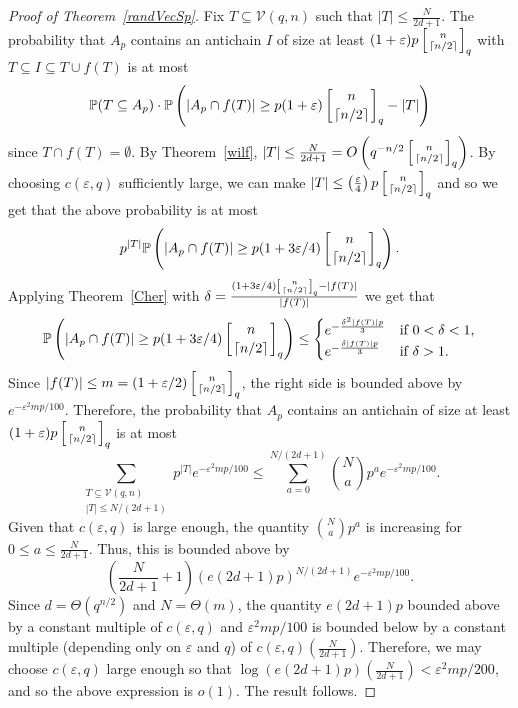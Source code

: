 \documentclass[11 pt]{article}
\theoremstyle{definition}
\theoremstyle{case}
\numberwithin{equation}{section}
\newcommand{\qbinom}[3]{\left[\genfrac{}{}{0pt}{}{#1}{#2}\right]_{#3}}
\newcommand{\Vectors}[2]{\mathcal{V}\left(#1,#2\right)}
\begin{document}
\begin{proof}[Proof of Theorem~\ref{randVecSp}]
 Fix $T\subseteq \Vectors{q}{n}$ such that $|T|\leq\frac{ N}{2d+1}$. The probability that $A_p$ contains an antichain $I$ of size at least $(1+\varepsilon)p\qbinom{n}{\left\lceil n/2\right\rceil}{q}$ with $T\subseteq I\subseteq T\cup f(T)$ is at most
\[\mathbb{P}(T\subseteq A_p)\cdot\mathbb{P}\left(|A_p\cap f(T)|\geq p(1+\varepsilon)\qbinom{n}{\left\lceil n/2\right\rceil}{q}-|T|\right)\]
since $T\cap f(T)=\emptyset$. By Theorem~\ref{wilf}, $|T|\leq \frac{ N}{2d+1}=O\left(q^{-n/2}\qbinom{n}{\left\lceil n/2\right\rceil}{q}\right)$. By choosing $c(\varepsilon,q)$ sufficiently large, we can make $|T|\leq \left(\frac{\varepsilon}{4}\right)p\qbinom{n}{\left\lceil n/2\right\rceil}{q}$ and so we get that the above probability is at most
\[p^{|T|}\mathbb{P}\left(|A_p\cap f(T)|\geq p(1+3\varepsilon/4)\qbinom{n}{\left\lceil n/2\right\rceil}{q}\right).\]
Applying Theorem~\ref{Cher} with $\delta=\frac{(1+3\varepsilon/4)\qbinom{n}{\left\lceil n/2\right\rceil}{q}- |f(T)|}{|f(T)|}$ we get that
\[\mathbb{P}\left(|A_p\cap f(T)|\geq p(1+3\varepsilon/4)\qbinom{n}{\left\lceil n/2\right\rceil}{q}\right)\leq 
\begin{cases}  e^{-\frac{\delta^2|f(T)|p}{3}}& \text{if }0<\delta<1, \\
						  e^{-\frac{\delta|f(T)|p}{3}}& \text{if }\delta>1.\end{cases}\]
Since $|f(T)|\leq m = (1+\varepsilon/2)\qbinom{n}{\left\lceil n/2\right\rceil}{q}$, the right side is bounded above by $e^{-\varepsilon^2 mp/100}$. Therefore, the probability that $A_p$ contains an antichain of size at least $(1+\varepsilon)p\qbinom{n}{\left\lceil n/2\right\rceil}{q}$ is at most
\[\sum_{\substack{T\subseteq \Vectors{q}{n}\\ |T|\leq  N/(2d+1)}}p^{|T|}e^{-\varepsilon^2mp/100} \leq\sum_{a=0}^{ N/(2 d+1)}\binom{ N}{a}p^ae^{-\varepsilon^2mp/100}.\]
Given that $c(\varepsilon,q)$ is large enough, the quantity $\binom{ N}{a}p^a$ is increasing for $0\leq a\leq \frac{ N}{2 d+1}$. Thus, this is bounded above by
\[\left(\frac{ N}{2 d+1} + 1\right)\left(e(2d+1)p\right)^{ N/(2 d+1)}e^{-\varepsilon^2mp/100}.\]
Since $d=\Theta\left(q^{n/2}\right)$ and $N=\Theta(m)$, the quantity $e(2d+1)p$ bounded above by a constant multiple of $c(\varepsilon,q)$ and $\varepsilon^2mp/100$ is bounded below by a constant multiple (depending only on $\varepsilon$ and $q$) of $c(\varepsilon,q)\left(\frac{N}{2d+1}\right)$. Therefore, we may choose $c(\varepsilon,q)$ large enough so that $\log(e(2d+1)p)\left(\frac{N}{2d+1}\right)< \varepsilon^2mp/200$, and so the above expression is $o(1)$. The result follows.
\end{proof}
\end{document}
